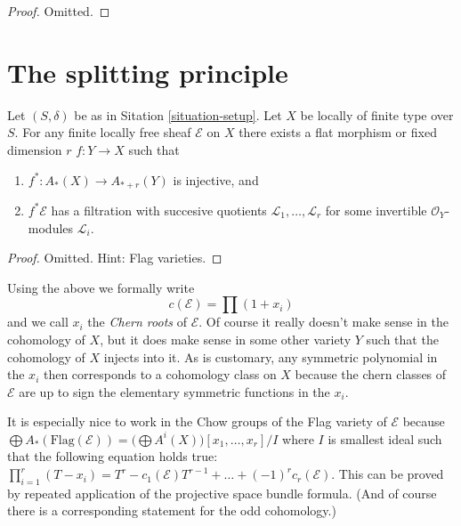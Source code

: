 \begin{proof}
Omitted.
\end{proof}


\section{The splitting principle}
\label{section-splitting-principle}


\begin{lemma}
\label{lemma-splitting-principle}
Let $(S, \delta)$ be as in Sitation \ref{situation-setup}.
Let $X$ be locally of finite type over $S$.
For any finite locally free sheaf ${\mathcal E}$ on $X$
there exists a flat morphism or fixed dimension $r$
$f : Y \to X$ such that
\begin{enumerate}
\item $f^* : A_*(X) \to A_{* + r}(Y)$ is injective, and
\item $f^*{\mathcal E}$ has a filtration
with succesive quotients ${\mathcal L}_1, \ldots, {\mathcal L}_r$
for some invertible ${\mathcal O}_Y$-modules ${\mathcal L}_i$.
\end{enumerate}
\end{lemma}

\begin{proof}
Omitted. Hint: Flag varieties.
\end{proof}

\noindent
Using the above we formally write
$$
c({\mathcal E}) = \prod\nolimits (1+x_i)
$$
and we call $x_i$ the {\it Chern roots} of ${\mathcal E}$.
Of course it really doesn't make sense in the cohomology 
of $X$, but it does make sense in some other variety
$Y$ such that the cohomology of $X$ injects into it.
As is customary, any symmetric polynomial in the $x_i$
then corresponds to a cohomology class on $X$ because
the chern classes of ${\mathcal E}$ are up to sign the 
elementary symmetric functions in the $x_i$.

\medskip\noindent
It is especially nice to work in the
Chow groups of the Flag variety of ${\mathcal E}$ because
$ \bigoplus A_*(\text{Flag}({\mathcal E})) =
\big(\bigoplus A^{i}(X)\big) [x_1,\ldots,x_r]/I $
where $I$ is smallest ideal such that the following
equation holds true:
$ \prod_{i=1}^r (T - x_i) =  T^r - c_1({\mathcal E}) T^{r-1}+ \ldots
+ (-1)^r c_r({\mathcal E})$. This can be proved by repeated application
of the projective space bundle formula. (And of course there
is a corresponding statement for the odd cohomology.)






